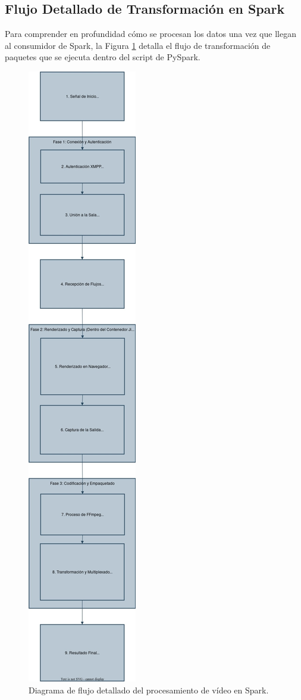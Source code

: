 \subsection{Flujo Detallado de Transformación en Spark}
Para comprender en profundidad cómo se procesan los datos una vez que llegan al consumidor de Spark, la Figura \ref{fig:flujo_transformacion_spark} detalla el flujo de transformación de paquetes que se ejecuta dentro del script de PySpark.

\begin{figure}[H]
    \centering
    \includegraphics[height=\textheight]{img/FlujoDetalladodeTransformaciondePaquetes.jpg}
    \caption{Diagrama de flujo detallado del procesamiento de vídeo en Spark.}
    \label{fig:flujo_transformacion_spark}
\end{figure}

